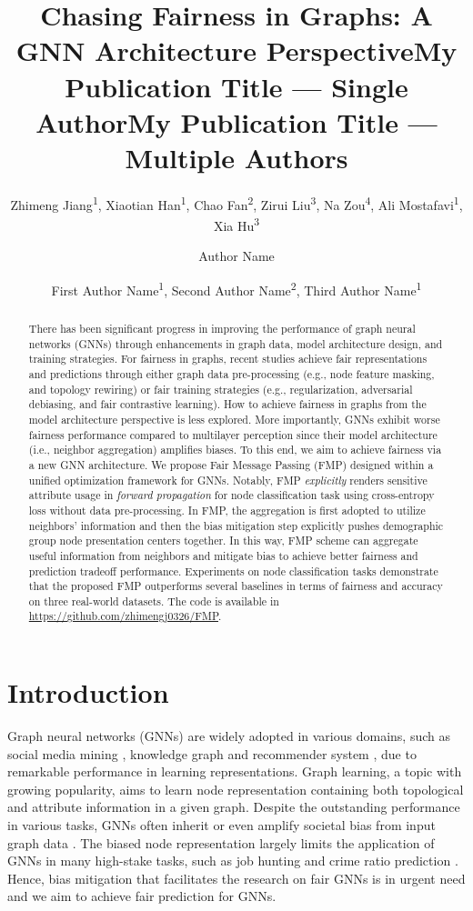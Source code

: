 \documentclass[letterpaper]{article} %
\title{Chasing Fairness in Graphs: A GNN Architecture Perspective}
\author{
    Zhimeng Jiang\textsuperscript{\rm 1}, %
    Xiaotian Han\textsuperscript{\rm 1},
    Chao Fan\textsuperscript{\rm 2},
    Zirui Liu\textsuperscript{\rm 3},
    Na Zou\textsuperscript{\rm 4},
    Ali Mostafavi\textsuperscript{\rm 1},
    Xia Hu\textsuperscript{\rm 3}
}
\title{My Publication Title --- Single Author}
\author {
    Author Name
}
\title{My Publication Title --- Multiple Authors}
\author {
    First Author Name\textsuperscript{\rm 1},
    Second Author Name\textsuperscript{\rm 2},
    Third Author Name\textsuperscript{\rm 1}
}
\theoremstyle{plain}
\theoremstyle{definition}
\theoremstyle{remark}
\begin{document}
\maketitle

\begin{abstract}
There has been significant progress in improving the performance of graph neural networks (GNNs) through enhancements in graph data, model architecture design, and training strategies. For fairness in graphs, recent studies achieve fair representations and predictions through either graph data pre-processing (e.g., node feature masking, and topology rewiring) or fair training strategies (e.g., regularization, adversarial debiasing, and fair contrastive learning). How to achieve fairness in graphs from the model architecture perspective is less explored. More importantly, GNNs exhibit worse fairness performance compared to multilayer perception since their model architecture (i.e., neighbor aggregation) amplifies biases. To this end, we aim to achieve fairness via a new GNN architecture. We propose \textsf{F}air \textsf{M}essage \textsf{P}assing (FMP) designed within a unified optimization framework for GNNs. Notably, FMP \textit{explicitly} renders sensitive attribute usage in \textit{forward propagation} for node classification task using cross-entropy loss without data pre-processing. In FMP, the aggregation is first adopted to utilize neighbors' information and then the bias mitigation step explicitly pushes demographic group node presentation centers together.
In this way, FMP scheme can aggregate useful information from neighbors and mitigate bias to achieve better fairness and prediction tradeoff performance. 
Experiments on node classification tasks demonstrate that the proposed FMP outperforms several baselines in terms of fairness and accuracy on three real-world datasets. The code is available in {\url{https://github.com/zhimengj0326/FMP}}.
\end{abstract}



\section{Introduction}
\label{sect:intro}
Graph neural networks (GNNs) \citep{kipf2017semi,velivckovic2018graph,wu2019simplifying,ling2023graph,han2022g,han2022geometric} are widely adopted in various domains, such as social media mining \citep{hamilton2017inductive}, knowledge graph \citep{hamaguchi2017knowledge} and recommender system \citep{ying2018graph}, due to remarkable performance in learning representations. Graph learning, a topic with growing popularity, aims to learn node representation containing both topological and attribute information in a given graph. Despite the outstanding performance in various tasks, GNNs often inherit or even amplify societal bias from input graph data \citep{dai2021say}.
The biased node representation largely limits the application of GNNs in many high-stake tasks, such as job hunting \citep{mehrabi2021survey} and crime ratio prediction \citep{suresh2019framework}. Hence, bias mitigation that facilitates the research on fair GNNs is in urgent need and we aim to achieve fair prediction for GNNs.
\end{document}
